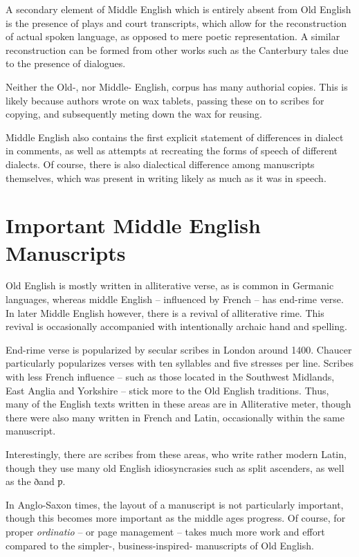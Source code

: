 \documentclass[12pt]{report}
\newcommand{\eth}{ð}
\newcommand{\wynn}{ƿ}
\begin{document}
A secondary element of Middle English which is entirely absent from Old English 
is the presence of plays and court transcripts, which allow for the
reconstruction of actual spoken language, as opposed to mere poetic
representation. A similar reconstruction can be formed from other works such as
the Canterbury tales due to the presence of dialogues.

Neither the Old-, nor Middle- English, corpus has many authorial copies. This is
likely because authors wrote on wax tablets, passing these on to scribes for
copying, and subsequently meting down the wax for reusing.

Middle English also contains the first explicit statement of differences in
dialect in comments, as well as attempts at recreating the forms of speech of
different dialects. Of course, there is also dialectical difference among
manuscripts themselves, which was present in writing likely as much as it was in
speech.

\chapter{Important Middle English Manuscripts}

Old English is mostly written in alliterative verse, as is common in Germanic
languages, whereas middle English -- influenced by French -- has end-rime verse.
In later Middle English however, there is a revival of alliterative rime. This
revival is occasionally accompanied with intentionally archaic hand and
spelling.

End-rime verse is popularized by secular scribes in London around 1400. Chaucer
particularly popularizes verses with ten syllables and five stresses per line.
Scribes with less French influence -- such as those located in the Southwest
Midlands, East Anglia and Yorkshire -- stick more to the Old English traditions.
Thus, many of the English texts written in these areas are in Alliterative
meter, though there were also many written in French and Latin, occasionally
within the same manuscript.

Interestingly, there are scribes from these areas, who write rather modern
Latin, though they use many old English idiosyncrasies such as split
ascenders, as well as the \eth and \wynn.

In Anglo-Saxon times, the layout of a manuscript is not particularly important,
though this becomes more important as the middle ages progress. Of course, for
proper \emph{ordinatio} -- or page management -- takes much more work and effort
compared to the simpler-, business-inspired- manuscripts of Old English.
\end{document}
